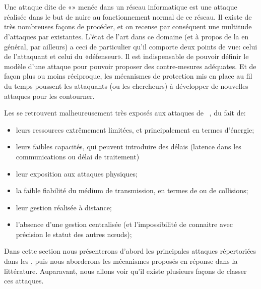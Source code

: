 \section{\Dds}\label{ea:sec:dos}

Une attaque dite de «\dds» menée dans un réseau informatique est une attaque réalisée dans le but de nuire au fonctionnement normal de ce réseau.
Il existe de très nombreuses façons de procéder, et on recense par conséquent une multitude d'attaques par \dds existantes.
L'état de l'art dans ce domaine (et à propos de la \secu en général, par ailleurs) a ceci de particulier qu'il comporte deux points de vue: celui de l'attaquant et celui du «défenseur».
Il est indispensable de pouvoir définir le modèle d'une attaque pour pouvoir proposer des contre-mesures adéquates.
Et de façon plus ou moins réciproque, les mécanismes de protection mis en place au fil du temps poussent les attaquants (ou les chercheurs) à développer de nouvelles attaques pour les contourner.

Les \rcs se retrouvent malheureusement très exposés aux attaques de \dds~\cite{RM11}, du fait de:
\begin{itemize}
    \item leurs ressources extrêmement limitées, et principalement en termes d'énergie;
    \item leurs faibles capacités, qui peuvent introduire des délais (latence dans les communications ou délai de traitement)
    \item leur exposition aux attaques physiques;
    \item la faible fiabilité du médium de transmission, en termes de  ou de collisions;
    \item leur gestion réalisée à distance;
    \item l'absence d'une gestion centralisée (et l'impossibilité de connaitre avec précision le statut des autres nœuds);
\end{itemize}

Dans cette section nous présenterons d'abord les principales attaques répertoriées dans les \rcs, puis nous aborderons les mécanismes proposés en réponse dans la littérature.
Auparavant, nous allons voir qu'il existe plusieurs façons de classer ces attaques.










